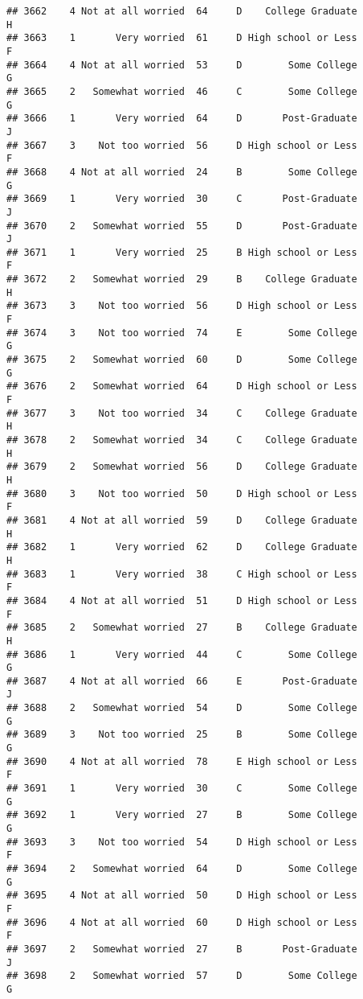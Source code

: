\documentclass[
]{article}
\begin{document}
\begin{verbatim}
## 3662    4 Not at all worried  64     D    College Graduate         H
## 3663    1       Very worried  61     D High school or Less         F
## 3664    4 Not at all worried  53     D        Some College         G
## 3665    2   Somewhat worried  46     C        Some College         G
## 3666    1       Very worried  64     D       Post-Graduate         J
## 3667    3    Not too worried  56     D High school or Less         F
## 3668    4 Not at all worried  24     B        Some College         G
## 3669    1       Very worried  30     C       Post-Graduate         J
## 3670    2   Somewhat worried  55     D       Post-Graduate         J
## 3671    1       Very worried  25     B High school or Less         F
## 3672    2   Somewhat worried  29     B    College Graduate         H
## 3673    3    Not too worried  56     D High school or Less         F
## 3674    3    Not too worried  74     E        Some College         G
## 3675    2   Somewhat worried  60     D        Some College         G
## 3676    2   Somewhat worried  64     D High school or Less         F
## 3677    3    Not too worried  34     C    College Graduate         H
## 3678    2   Somewhat worried  34     C    College Graduate         H
## 3679    2   Somewhat worried  56     D    College Graduate         H
## 3680    3    Not too worried  50     D High school or Less         F
## 3681    4 Not at all worried  59     D    College Graduate         H
## 3682    1       Very worried  62     D    College Graduate         H
## 3683    1       Very worried  38     C High school or Less         F
## 3684    4 Not at all worried  51     D High school or Less         F
## 3685    2   Somewhat worried  27     B    College Graduate         H
## 3686    1       Very worried  44     C        Some College         G
## 3687    4 Not at all worried  66     E       Post-Graduate         J
## 3688    2   Somewhat worried  54     D        Some College         G
## 3689    3    Not too worried  25     B        Some College         G
## 3690    4 Not at all worried  78     E High school or Less         F
## 3691    1       Very worried  30     C        Some College         G
## 3692    1       Very worried  27     B        Some College         G
## 3693    3    Not too worried  54     D High school or Less         F
## 3694    2   Somewhat worried  64     D        Some College         G
## 3695    4 Not at all worried  50     D High school or Less         F
## 3696    4 Not at all worried  60     D High school or Less         F
## 3697    2   Somewhat worried  27     B       Post-Graduate         J
## 3698    2   Somewhat worried  57     D        Some College         G

\end{verbatim}
\end{document}
